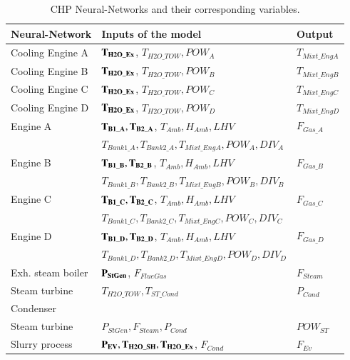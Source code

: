 \begin{table}[!t]
\caption{CHP Neural-Networks and their corresponding variables.}
\label{fignns}
  \centering
\begin{tabular}{lll} \toprule
 Neural-Network  & Inputs of the model & Output \\ \midrule
Cooling Engine A & $\bf{T_{H2O\_Ex}}$, $T_{H2O\_TOW}, POW_A $ & $T_{Mixt\_EngA} $ \\
Cooling Engine B & $\bf{T_{H2O\_Ex}}$, $T_{H2O\_TOW}, POW_B $ & $T_{Mixt\_EngB} $ \\
Cooling Engine C & $\bf{T_{H2O\_Ex}}$, $T_{H2O\_TOW}, POW_C $ & $T_{Mixt\_EngC} $ \\
Cooling Engine D& $\bf{T_{H2O\_Ex}}$, $T_{H2O\_TOW}, POW_D $ & $T_{Mixt\_EngD} $ \\

 Engine A& $\bf{T_{B1\_A}, T_{B2\_A}}$, $T_{Amb}, H_{Amb}, LHV $ & $F_{Gas\_A} $ \\
 & $T_{Bank1\_A}, T_{Bank2\_A}, T_{Mixt\_EngA}, POW_A, DIV_A $ &  \\
 
 Engine B& $\bf{T_{B1\_B}, T_{B2\_B}}$, $T_{Amb}, H_{Amb}, LHV $ & $F_{Gas\_B} $ \\
 & $T_{Bank1\_B}, T_{Bank2\_B}, T_{Mixt\_EngB}, POW_B, DIV_B $ &  \\
 
 Engine C& $\bf{T_{B1\_C}, T_{B2\_C}}$, $T_{Amb}, H_{Amb}, LHV $ & $F_{Gas\_C} $ \\
 & $T_{Bank1\_C}, T_{Bank2\_C}, T_{Mixt\_EngC}, POW_C, DIV_C $ &  \\
 
 Engine D& $\bf{T_{B1\_D}, T_{B2\_D}}$, $T_{Amb}, H_{Amb}, LHV $ & $F_{Gas\_D} $ \\
 & $T_{Bank1\_D}, T_{Bank2\_D}, T_{Mixt\_EngD}, POW_D, DIV_D $ &  \\ 
 
Exh. steam boiler & $\bf{P_{StGen}}$, $F_{FlueGas}$ & $F_{Steam} $ \\
Steam turbine & $T_{H2O\_TOW}, T_{ST\_Cond}$ & $P_{Cond} $ \\
Condenser & & \\
Steam turbine & $P_{StGen}, F_{Steam}, P_{Cond}$ & $POW_{ST} $ \\
Slurry process & $\bf{P_{EV}, T_{H2O\_SH}, T_{H2O\_Ex}}$, $F_{Cond} $ & $F_{Ev}$ \\ \midrule


\end{tabular}
\vspace{-0.3cm}

\end{table}

